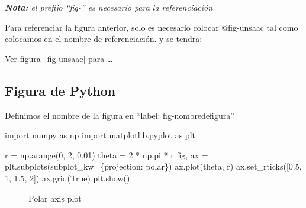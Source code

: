 \documentclass[
  12pt,
  letterpaper,
]{scrreprt}
\newenvironment{Shaded}{\begin{snugshade}}{\end{snugshade}}
\newcommand{\DecValTok}[1]{\textcolor[rgb]{0.68,0.00,0.00}{#1}}
\newcommand{\FloatTok}[1]{\textcolor[rgb]{0.68,0.00,0.00}{#1}}
\newcommand{\ImportTok}[1]{\textcolor[rgb]{0.00,0.46,0.62}{#1}}
\newcommand{\NormalTok}[1]{\textcolor[rgb]{0.00,0.23,0.31}{#1}}
\newcommand{\OperatorTok}[1]{\textcolor[rgb]{0.37,0.37,0.37}{#1}}
\newcommand{\StringTok}[1]{\textcolor[rgb]{0.13,0.47,0.30}{#1}}
\newcommand{\VariableTok}[1]{\textcolor[rgb]{0.07,0.07,0.07}{#1}}
\begin{document}
\emph{\textbf{Nota: }el prefijo ``fig-'' es necesario para la
referenciación}

Para referenciar la figura anterior, solo es necesario colocar
@fig-unsaac tal como colocamos en el nombre de referenciación. y se
tendra:

Ver figura~\ref{fig-unsaac} para \ldots{}

\subsection{Figura de Python}\label{figura-de-python}

Definimos el nombre de la figura en ``label: fig-nombredefigura''

\begin{Shaded}
\begin{Highlighting}[]
\ImportTok{import}\NormalTok{ numpy }\ImportTok{as}\NormalTok{ np}
\ImportTok{import}\NormalTok{ matplotlib.pyplot }\ImportTok{as}\NormalTok{ plt}

\NormalTok{r }\OperatorTok{=}\NormalTok{ np.arange(}\DecValTok{0}\NormalTok{, }\DecValTok{2}\NormalTok{, }\FloatTok{0.01}\NormalTok{)}
\NormalTok{theta }\OperatorTok{=} \DecValTok{2} \OperatorTok{*}\NormalTok{ np.pi }\OperatorTok{*}\NormalTok{ r}
\NormalTok{fig, ax }\OperatorTok{=}\NormalTok{ plt.subplots(subplot\_kw}\OperatorTok{=}\NormalTok{\{}\StringTok{\textquotesingle{}projection\textquotesingle{}}\NormalTok{: }\StringTok{\textquotesingle{}polar\textquotesingle{}}\NormalTok{\})}
\NormalTok{ax.plot(theta, r)}
\NormalTok{ax.set\_rticks([}\FloatTok{0.5}\NormalTok{, }\DecValTok{1}\NormalTok{, }\FloatTok{1.5}\NormalTok{, }\DecValTok{2}\NormalTok{])}
\NormalTok{ax.grid(}\VariableTok{True}\NormalTok{)}
\NormalTok{plt.show()}
\end{Highlighting}
\end{Shaded}

\begin{figure}[H]

\caption{\label{fig-chart}Polar axis plot}


\end{figure}%
\end{document}
